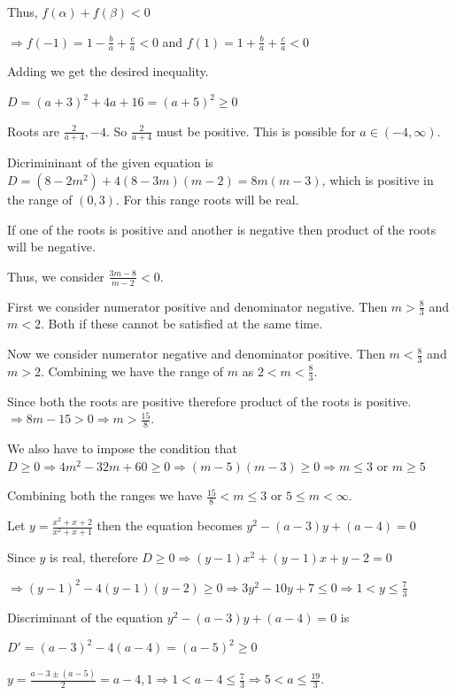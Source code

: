   Thus, $f(\alpha) + f\left(\beta\right) < 0$

  $\Rightarrow f(-1) = 1 -\frac{b}{a} + \frac{c}{a} < 0$ and $f(1) = 1 + \frac{b}{a} + \frac{c}{a} < 0$

  Adding we get the desired inequality.
\item $D = (a + 3)^2 + 4a + 16 = (a + 5)^2\geq 0$

  Roots are $\frac{2}{a + 4}, -4$. So $\frac{2}{a + 4}$ must be positive. This is possible for $a\in(-4,
  \infty)$.
\item Dicrimininant of the given equation is $D = (8 - 2m^2) + 4(8 - 3m)(m - 2) = 8m(m - 3)$, which is
  positive in the range of $(0, 3)$. For this range roots will be real.

  If one of the roots is positive and another is negative then product of the roots will be negative.

  Thus, we consider $\frac{3m - 8}{m - 2} < 0$.

  First we consider numerator positive and denominator negative. Then $m > \frac{8}{3}$ and $m < 2$. Both if
  these cannot be satisfied at the same time.

  Now we consider numerator negative and denominator positive. Then $m < \frac{8}{3}$ and $m > 2$. Combining
  we have the range of $m$ as $2 < m <\frac{8}{3}$.
\item Since both the roots are positive therefore product of the roots is positive. $\Rightarrow 8m - 15 > 0
  \Rightarrow m > \frac{15}{8}$.

  We also have to impose the condition that $D\geq 0 \Rightarrow 4m^2 - 32m + 60 \geq 0 \Rightarrow (m -
  5)(m - 3)\geq 0 \Rightarrow m \leq 3$ or $m \geq 5$

  Combining both the ranges we have $\frac{15}{8} < m \leq 3$ or $5\leq m < \infty$.
\item Let $y = \frac{x^2 + x + 2}{x^2 + x + 1}$ then the equation becomes $y^2 - (a - 3)y + (a - 4) = 0$

  Since $y$ is real, therefore $D\geq 0\Rightarrow (y - 1)x^2 + (y - 1)x + y - 2 = 0$

  $\Rightarrow (y - 1)^2 - 4(y - 1)(y - 2)\geq 0 \Rightarrow 3y^2 - 10y + 7\leq 0 \Rightarrow 1 < y \leq
  \frac{7}{3}$

  Discriminant of the equation $y^2 - (a - 3)y + (a - 4) = 0$ is

  $D' = (a - 3)^2 - 4(a - 4) = (a - 5)^2\geq 0$

  $y = \frac{a - 3 \pm (a - 5)}{2} = a - 4, 1 \Rightarrow 1< a - 4\leq \frac{7}{3}\Rightarrow 5 < a\leq
  \frac{19}{3}$.
\stopitemize
